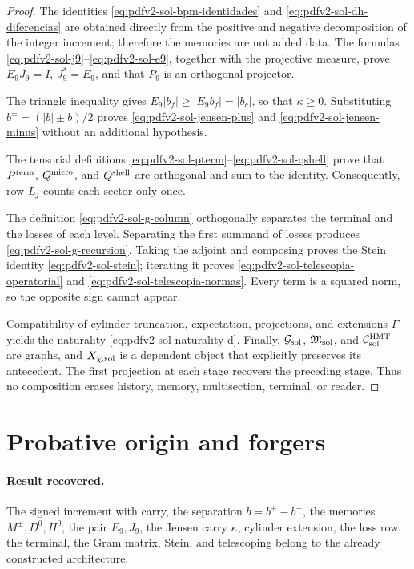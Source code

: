 \begin{proof}
The identities \eqref{eq:pdfv2-sol-bpm-identidades} and
\eqref{eq:pdfv2-sol-dh-diferencias} are obtained directly from the
positive and negative decomposition of the integer increment; therefore the
memories are not added data.  The formulas
\eqref{eq:pdfv2-sol-j9}--\eqref{eq:pdfv2-sol-e9}, together with the projective
measure, prove \(E_9J_9=I\), \(J_9^*=E_9\), and that \(P_9\) is an
orthogonal projector.

The triangle inequality gives
\(E_9|b_f|\geq|E_9b_f|=|b_c|\), so that
\(\kappa\geq0\).  Substituting
\(b^\pm=(|b|\pm b)/2\) proves
\eqref{eq:pdfv2-sol-jensen-plus} and
\eqref{eq:pdfv2-sol-jensen-minus} without an additional hypothesis.

The tensorial definitions
\eqref{eq:pdfv2-sol-pterm}--\eqref{eq:pdfv2-sol-qshell} prove that
\(P^{\rm term}\), \(Q^{\rm micro}\), and \(Q^{\rm shell}\) are orthogonal and
sum to the identity. Consequently, row \(L_j\) counts each sector only
once.

The definition \eqref{eq:pdfv2-sol-g-column} orthogonally separates the terminal
and the losses of each level.  Separating the first summand of losses produces
\eqref{eq:pdfv2-sol-g-recursion}.  Taking the adjoint and composing proves the
Stein identity \eqref{eq:pdfv2-sol-stein}; iterating it proves
\eqref{eq:pdfv2-sol-telescopia-operatorial} and
\eqref{eq:pdfv2-sol-telescopia-normas}.  Every term is a squared norm,
so the opposite sign cannot appear.

Compatibility of cylinder truncation, expectation, projections, and
extensions \(\Gamma\) yields the naturality
\eqref{eq:pdfv2-sol-naturality-d}. Finally,
\(\mathcal G_{\rm sol}\), \(\mathfrak M_{\rm sol}\), and
\(\mathcal C_{\rm sol}^{\rm HMT}\) are graphs, and
\(X_{\chi,{\rm sol}}\) is a dependent object that explicitly preserves
its antecedent. The first projection at each stage recovers the preceding
stage. Thus no composition erases history, memory, multisection,
terminal, or reader.
\end{proof}

\section{Probative origin and forgers}
\label{sec:pdfv2-sol-provenance-falsifiers}

\paragraph{Result recovered.}
The signed increment with carry, the separation \(b=b^+-b^-\), the memories
\(M^\pm,D^0,H^0\), the pair \(E_9,J_9\), the Jensen carry \(\kappa\), cylinder
extension, the loss row, the terminal, the Gram matrix, Stein, and telescoping
belong to the already constructed architecture.

